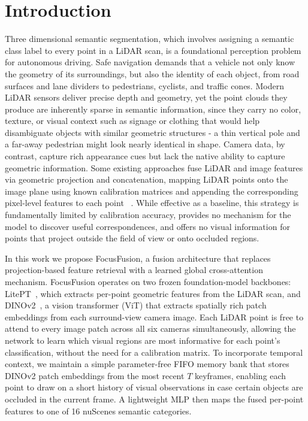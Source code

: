 \documentclass[10pt,twocolumn,letterpaper]{article}
\begin{document}
\section{Introduction}
Three dimensional semantic segmentation, which involves assigning a semantic class label to every point in a LiDAR scan, is a foundational perception problem for autonomous driving. Safe navigation demands that a vehicle not only know the geometry of its surroundings, but also the identity of each object, from road surfaces and lane dividers to pedestrians, cyclists, and traffic cones. Modern LiDAR sensors deliver precise depth and geometry, yet the point clouds they produce are inherently sparse in semantic information, since they carry no color, texture, or visual context such as signage or clothing that would help disambiguate objects with similar geometric structures - a thin vertical pole and a far-away pedestrian might look nearly identical in shape. Camera data, by contrast, capture rich appearance cues but lack the native ability to capture geometric information. Some existing approaches fuse LiDAR and image features via geometric projection and concatenation, mapping LiDAR points onto the image plane using known calibration matrices and appending the corresponding pixel-level features to each point ~\cite{xiao20243dopenvocabularypanopticsegmentation}. While effective as a baseline, this strategy is fundamentally limited by calibration accuracy, provides no mechanism for the model to discover useful correspondences, and offers no visual information for points that project outside the field of view or onto occluded regions.

In this work we propose FocusFusion, a fusion architecture that replaces projection-based feature retrieval with a learned global cross-attention mechanism. FocusFusion operates on two frozen foundation-model backbones: LitePT~\cite{litept2025}, which extracts per-point geometric features from the LiDAR scan, and DINOv2~\cite{oquab2024dinov2learningrobustvisual}, a vision transformer (ViT) that extracts spatially rich patch embeddings from each surround-view camera image. Each LiDAR point is free to attend to every image patch across all six cameras simultaneously, allowing the network to learn which visual regions are most informative for each point's classification, without the need for a calibration matrix. To incorporate temporal context, we maintain a simple parameter-free FIFO memory bank that stores DINOv2 patch embeddings from the most recent $T$ keyframes, enabling each point to draw on a short history of visual observations in case certain objects are occluded in the current frame. A lightweight MLP then maps the fused per-point features to one of 16 nuScenes semantic categories.
\end{document}
